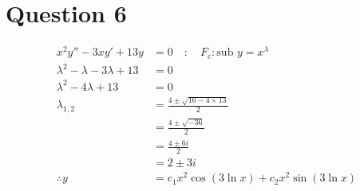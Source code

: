 \documentclass{article}
\begin{document}
\section*{Question 6}
\begin{align*}
    x^2y''-3xy'+13y               & =0\quad:\quad F_c:\text{sub }y=x^\lambda \\
    \lambda^2-\lambda-3\lambda+13 & =0                                       \\
    \lambda^2-4\lambda+13         & =0                                       \\
    \lambda_{1,2}                 & = \frac{4\pm\sqrt{16-4\times13}}{2}      \\
                                  & = \frac{4\pm\sqrt{-36}}{2}               \\
                                  & = \frac{4\pm6i}{2}                       \\
                                  & = 2\pm3i                                 \\
    \therefore y                  & =c_1x^2\cos(3\ln x)+c_2x^2\sin(3\ln x)
\end{align*}
\end{document}
